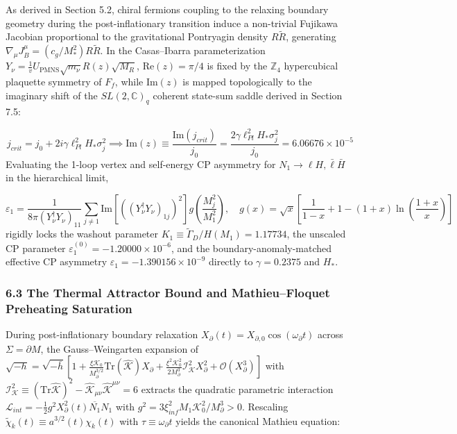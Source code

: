 \documentclass[aps,prd,onecolumn,superscriptaddress,nofootinbib,longbibliography,10pt]{revtex4-2}
\begin{document}
{{As derived in Section 5.2, chiral fermions coupling to the relaxing boundary geometry during the post-inflationary transition induce a non-trivial Fujikawa Jacobian proportional to the gravitational Pontryagin density \(R\tilde{R}\), generating \(\nabla_\mu J_B^\mu = (c_g / M_*^2)R\tilde{R}\). In the Casas--Ibarra parameterization \(Y_\nu = \frac{1}{v} U_{\mathrm{PMNS}} \sqrt{m_\nu} R(z) \sqrt{M_R}\), \(\mathrm{Re}(z) = \pi/4\) is fixed by the \(\mathbb{Z}_4\) hypercubical plaquette symmetry of \(F_f\), while \(\mathrm{Im}(z)\) is mapped topologically to the imaginary shift of the \(SL(2,\mathbb{C})_q\) coherent state-sum saddle derived in Section 7.5:


\[j_{crit} = j_0 + 2i\gamma \ell_{Pl}^2 H_* \sigma_j^2 \implies \mathrm{Im}(z) \equiv \frac{\mathrm{Im}(j_{crit})}{j_0} = \frac{2\gamma \ell_{Pl}^2 H_* \sigma_j^2}{j_0} = 6.06676 \times 10^{-5}\]
Evaluating the 1-loop vertex and self-energy CP asymmetry for \(N_1 \to \ell H, \bar{\ell}\bar{H}\) in the hierarchical limit,


\[\varepsilon_1 = \frac{1}{8\pi(Y_\nu^\dagger Y_\nu)_{11}} \sum_{j \neq 1} \mathrm{Im}[((Y_\nu^\dagger Y_\nu)_{1j})^2] g\!\left(\frac{M_j^2}{M_1^2}\right), \quad g(x) = \sqrt{x} \left[ \frac{1}{1-x} + 1 - (1+x)\ln\!\left(\frac{1+x}{x}\right) \right]\]
rigidly locks the washout parameter \(K_1 \equiv \tilde{\Gamma}_D / H(M_1) = 1.17734\), the unscaled CP parameter \(\varepsilon_1^{(0)} = -1.20000 \times 10^{-6}\), and the boundary-anomaly-matched effective CP asymmetry \(\varepsilon_1 = -1.390156 \times 10^{-9}\) directly to \(\gamma = 0.2375\) and \(H_*\).




\subsubsection*{6.3 The Thermal Attractor Bound and Mathieu--Floquet Preheating Saturation}

During post-inflationary boundary relaxation \(X_\partial(t) = X_{\partial,0} \cos(\omega_\partial t)\) across \(\Sigma = \partial M\), the Gauss--Weingarten expansion of \(\sqrt{-h} = \sqrt{-\bar{h}} \left[ 1 + \frac{\xi \mathcal{K}_0}{M_\partial^{3/2}} \mathrm{Tr}(\hat{\mathcal{K}}) X_\partial + \frac{\xi^2 \mathcal{K}_0^2}{2M_\partial^3} \mathcal{I}_{\mathcal{K}}^2 X_\partial^2 + \mathcal{O}(X_\partial^3) \right]\) with \(\mathcal{I}_{\mathcal{K}}^2 \equiv (\mathrm{Tr}\hat{\mathcal{K}})^2 - \hat{\mathcal{K}}_{\mu\nu}\hat{\mathcal{K}}^{\mu\nu} = 6\) extracts the quadratic parametric interaction \(\mathcal{L}_{int} = -\frac{1}{2}g^2 X_\partial^2(t) \overline{N_1} N_1\) with \(g^2 = 3\xi_{inf}^2 M_1 \mathcal{K}_0^2 / M_\partial^3 > 0\). Rescaling \(\tilde{\chi}_k(t) \equiv a^{3/2}(t)\chi_k(t)\) with \(\tau \equiv \omega_\partial t\) yields the canonical Mathieu equation:


}}
\end{document}
